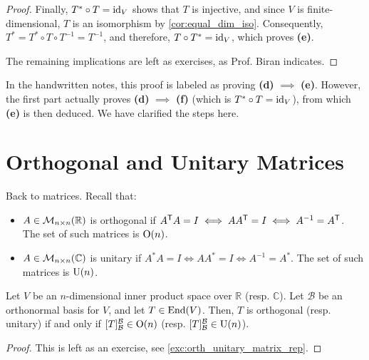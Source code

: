 \begin{proof}
Finally, $T^* \circ T = \operatorname{id}_V$ shows that $T$ is injective, and since $V$ is finite-di\-men\-sional, $T$ is an isomorphism by \cref{cor:equal_dim_iso}. Consequently, $T^* = T^* \circ T \circ T^{-1} = T^{-1}$, and therefore, $T \circ T^* = \operatorname{id}_V$, which proves \textbf{(e)}.

The remaining implications are left as exercises, as Prof. Biran indicates.
\end{proof}

\begin{ainote}
In the handwritten notes, this proof is labeled as proving \textbf{(d)} $\implies$ \textbf{(e)}. However, the first part actually proves \textbf{(d)} $\implies$ \textbf{(f)} (which is $T^* \circ T = \operatorname{id}_V$), from which \textbf{(e)} is then deduced. We have clarified the steps here.
\end{ainote}

\section{Orthogonal and Unitary Matrices}

\noindent
Back to matrices. Recall that:
\begin{itemize}
    \item $A \in \mathcal{M}_{n \times n}(\mathbb{R})$ is orthogonal if $A^{\mathsf{T}} A = I \iff AA^{\mathsf{T}} = I \iff A^{-1} = A^{\mathsf{T}}$. The set of such matrices is $\operatorname{O}(n)$.
    \item $A \in \mathcal{M}_{n \times n}(\mathbb{C})$ is unitary if $A^* A = I \iff AA^* = I \iff A^{-1} = A^*$. The set of such matrices is $\operatorname{U}(n)$.
\end{itemize}

\begin{proposition}
\label{prop:orth_unitary_matrix_rep}
Let $V$ be an $n$-di\-men\-sional inner product space over $\mathbb{R}$ (resp. $\mathbb{C}$). Let $\mathcal{B}$ be an orthonormal basis for $V$, and let $T \in \operatorname{End}(V)$. Then, $T$ is orthogonal (resp. unitary) if and only if $[T]_{\mathcal{B}}^{\mathcal{B}} \in \operatorname{O}(n)$ (resp. $[T]_{\mathcal{B}}^{\mathcal{B}} \in \operatorname{U}(n)$).
\end{proposition}

\begin{proof}
This is left as an exercise, see \cref{exc:orth_unitary_matrix_rep}.
\end{proof}

